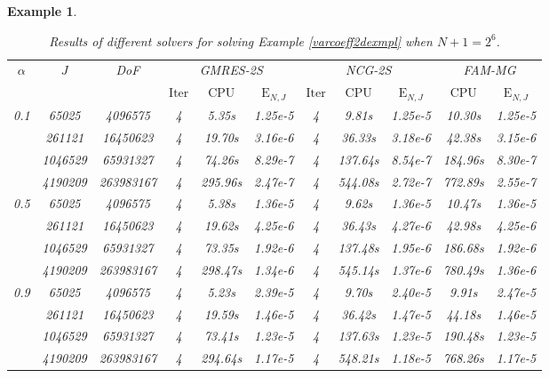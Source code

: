 \documentclass[11pt]{article}%
\numberwithin{equation}{section}
\newtheorem{example}{Example}
\begin{document}
\begin{example}
{		\begin{table}[H]
			\begin{center}
				\caption{Results of different solvers for solving Example \ref{varcoeff2dexmpl} when  $N+1=2^6$.}\label{varcoeff2dexmpltb2}
				\setlength{\tabcolsep}{0.43em}
				\begin{tabular}[c]{ccc|ccc|ccc|cc}
					\hline
					\multirow{2}{*}{$\alpha$} &\multirow{2}{*}{$J$}  &\multirow{2}{*}{DoF}& \multicolumn{3}{c|}{GMRES-2S}   &\multicolumn{3}{c|}{NCG-2S}& \multicolumn{2}{c}{FAM-MG}\\
					\cline{4-11}
					&&&$\mathrm{Iter}$&$\mathrm{CPU}$&$\mathrm{E}_{N,J}$&$\mathrm{Iter}$&$\mathrm{CPU}$&$\mathrm{E}_{N,J}$&$\mathrm{CPU}$&$\mathrm{E}_{N,J}$\\
					\hline
					\multirow{4}{*}{0.1} 
					&65025   &4096575  &4   &5.35s   &1.25e-5 &4   &9.81s    &1.25e-5&10.30s &1.25e-5 \\
					&261121  &16450623 &4   &19.70s  &3.16e-6 &4   &36.33s   &3.18e-6&42.38s &3.15e-6 \\
					&1046529 &65931327 &4   &74.26s  &8.29e-7 &4   &137.64s  &8.54e-7&184.96s&8.30e-7 \\
					&4190209 &263983167&4   &295.96s &2.47e-7 &4   &544.08s  &2.72e-7&772.89s&2.55e-7 \\
					\hline
					\multirow{4}{*}{0.5} 
					&65025   &4096575  &4   &5.38s   &1.36e-5 &4   &9.62s    &1.36e-5&10.47s &1.36e-5 \\
					&261121  &16450623 &4   &19.62s  &4.25e-6 &4   &36.43s   &4.27e-6&42.98s &4.25e-6 \\
					&1046529 &65931327 &4   &73.35s  &1.92e-6 &4   &137.48s  &1.95e-6&186.68s&1.92e-6 \\
					&4190209 &263983167&4   &298.47s &1.34e-6 &4   &545.14s  &1.37e-6&780.49s&1.36e-6 \\
					\hline
					\multirow{4}{*}{0.9}
					&65025   &4096575  &4   &5.23s   &2.39e-5 &4   &9.70s    &2.40e-5&9.91s  &2.47e-5 \\
					&261121  &16450623 &4   &19.59s  &1.46e-5 &4   &36.42s   &1.47e-5&44.18s &1.46e-5 \\
					&1046529 &65931327 &4   &73.41s  &1.23e-5 &4   &137.63s  &1.23e-5&190.48s&1.23e-5 \\
					&4190209 &263983167&4   &294.64s &1.17e-5 &4   &548.21s  &1.18e-5&768.26s&1.17e-5 \\
					\hline
				\end{tabular}
			\end{center}
		\end{table}
	}
\end{example}
\end{document}
